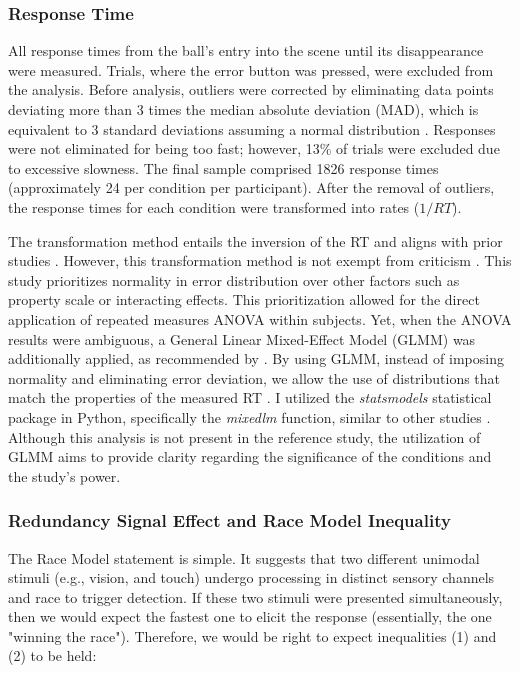\documentclass[12pt,oneside,openright]{report}
\begin{document}
\subsubsection*{Response Time}

All response times from the ball's entry into the scene until its disappearance were measured. Trials, where the error button was pressed, were excluded from the analysis. Before analysis, outliers were corrected by eliminating data points deviating more than 3 times the median absolute deviation (MAD), which is equivalent to 3 standard deviations assuming a normal distribution \parencite{Innes2019ACA}. Responses were not eliminated for being too fast; however, 13\% of trials were excluded due to excessive slowness. The final sample comprised 1826 response times (approximately 24 per condition per participant). After the removal of outliers, the response times for each condition were transformed into rates ($1/RT$).

The transformation method entails the inversion of the RT and aligns with prior studies \parencite{Innes2019ACA}. However, this transformation method is not exempt from criticism \parencite{Lo2015-fv}. This study prioritizes normality in error distribution over other factors such as property scale or interacting effects. This prioritization allowed for the direct application of repeated measures ANOVA within subjects. Yet, when the ANOVA results were ambiguous, a General Linear Mixed-Effect Model (GLMM) was additionally applied, as recommended by \textcite{Lo2015-fv}. By using GLMM, instead of imposing normality and eliminating error deviation, we allow the use of distributions that match the properties of the measured RT \parencite{Lo2015-fv}. I utilized the \textit{statsmodels} statistical package in Python, specifically the \textit{mixedlm} function, similar to other studies \parencite{RSE_FBI}. Although this analysis is not present in the reference study, the utilization of GLMM aims to provide clarity regarding the significance of the conditions and the study's power.

\subsubsection*{Redundancy Signal Effect and Race Model Inequality}

The Race Model statement is simple. It suggests that two different unimodal stimuli (e.g., vision, and touch) undergo processing in distinct sensory channels and race to trigger detection. If these two stimuli were presented simultaneously, then we would expect the fastest one to elicit the response (essentially, the one "winning the race"). Therefore, we would be right to expect inequalities (1) and (2) to be held:
\end{document}
